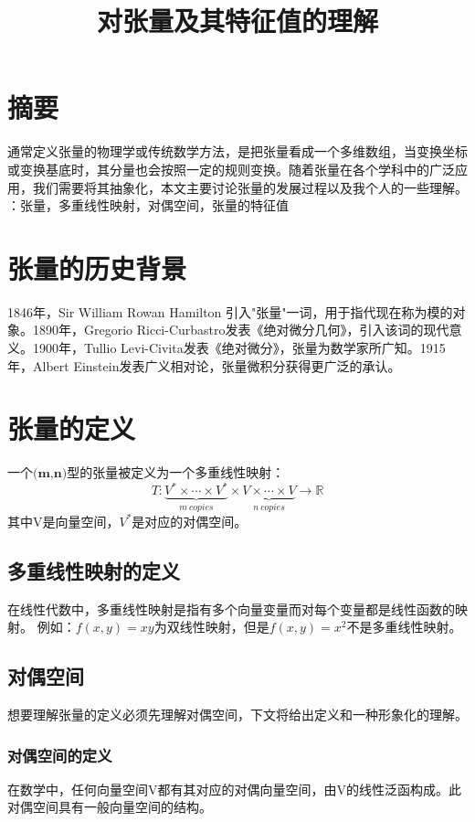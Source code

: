 \documentclass[UTF8]{ctexart}
\title{对张量及其特征值的理解}
\begin{document}
\fontsize{12pt}{18pt}
\selectfont
\date{}
\maketitle
\section{摘要}
通常定义张量的物理学或传统数学方法，是把张量看成一个多维数组，当变换坐标或变换基底时，其分量也会按照一定的规则变换。随着张量在各个学科中的广泛应用，我们需要将其抽象化，本文主要讨论张量的发展过程以及我个人的一些理解。\newline
{}：张量，多重线性映射，对偶空间，张量的特征值
\section{张量的历史背景}
1846年，Sir William Rowan Hamilton 引入"张量"一词，用于指代现在称为模的对象。1890年，Gregorio Ricci-Curbastro发表《绝对微分几何》，引入该词的现代意义。1900年，Tullio Levi-Civita发表《绝对微分》，张量为数学家所广知。1915年，Albert Einstein发表广义相对论，张量微积分获得更广泛的承认。
\section{张量的定义}
一个$\textbf{(m,n)}$型的张量被定义为一个多重线性映射：
$$T : \underbrace{V^* \times \cdots \times V^*}_{m \ copies} \times \underbrace{V \times \cdots \times V}_{n \ copies} \to \mathbb{R}$$
其中V是向量空间，$V^*$是对应的对偶空间。\cite{lawden1982introduction}
\subsection{多重线性映射的定义}
在线性代数中，多重线性映射是指有多个向量变量而对每个变量都是线性函数的映射。 \newline
例如：$f(x,y) = xy$为双线性映射，但是$f(x,y) = x^2$不是多重线性映射。
\subsection{对偶空间}
想要理解张量的定义必须先理解对偶空间，下文将给出定义和一种形象化的理解。
\subsubsection{对偶空间的定义}
在数学中，任何向量空间V都有其对应的对偶向量空间，由V的线性泛函构成。此对偶空间具有一般向量空间的结构。\cite{bourbaki1989algebra}
\end{document}
